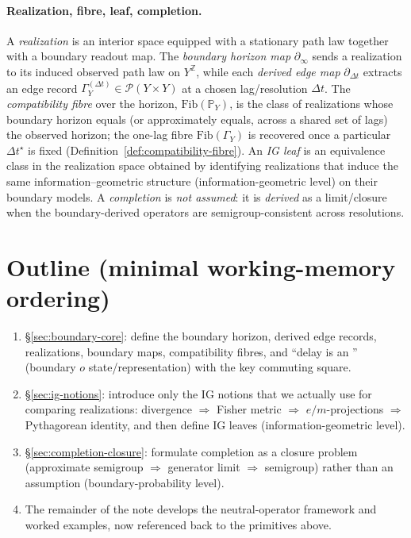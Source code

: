 \documentclass[11pt]{article}
\newcommand{\Pcal}{\mathcal{P}}
\newcommand{\Fib}{\mathrm{Fib}} %
\begin{document}
\paragraph{Realization, fibre, leaf, completion.}
A \emph{realization} is an interior space equipped with a stationary path law together with a boundary readout map.
The \emph{boundary horizon map} $\partial_\infty$ sends a realization to its induced observed path law on $Y^{\mathbb Z}$, while each \emph{derived edge map} $\partial_{\Delta t}$ extracts an edge record $\Gamma_Y^{(\Delta t)}\in\Pcal(Y\times Y)$ at a chosen lag/resolution $\Delta t$.
The \emph{compatibility fibre} over the horizon, $\Fib(\mathbb P_Y)$, is the class of realizations whose boundary horizon equals (or approximately equals, across a shared set of lags) the observed horizon; the one-lag fibre $\Fib(\Gamma_Y)$ is recovered once a particular $\Delta t^\star$ is fixed (Definition~\ref{def:compatibility-fibre}).
An \emph{IG leaf} is an equivalence class in the realization space obtained by identifying realizations that induce the same information--geometric structure (information-geometric level) on their boundary models.
A \emph{completion} is \emph{not assumed}: it is \emph{derived} as a limit/closure when the boundary-derived operators are semigroup-consistent across resolutions.

\section*{Outline (minimal working-memory ordering)}
\begin{enumerate}[leftmargin=1.8em]
\item \S\ref{sec:boundary-core}: define the boundary horizon, derived edge records, realizations, boundary maps, compatibility fibres, and ``delay is an '' (boundary $	o$ state/representation) with the key commuting square.
\item \S\ref{sec:ig-notions}: introduce only the IG notions that we actually use for comparing realizations: divergence $\Rightarrow$ Fisher metric $\Rightarrow$ $e/m$-projections $\Rightarrow$ Pythagorean identity, and then define IG leaves (information-geometric level).
\item \S\ref{sec:completion-closure}: formulate completion as a closure problem (approximate semigroup $\Rightarrow$ generator limit $\Rightarrow$ semigroup) rather than an assumption (boundary-probability level).
\item The remainder of the note develops the neutral-operator framework and worked examples, now referenced back to the primitives above.
\end{enumerate}
\end{document}
